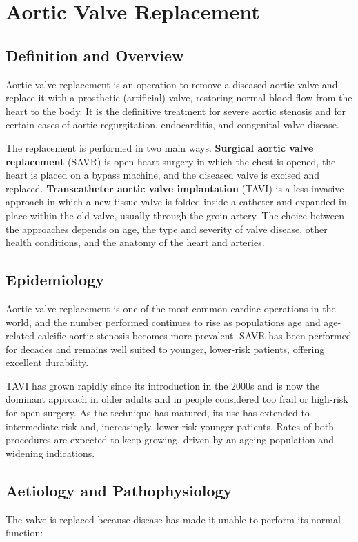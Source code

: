 \chapter{Aortic Valve Replacement}

\section*{Definition and Overview}
Aortic valve replacement is an operation to remove a diseased aortic valve and replace it with a prosthetic (artificial) valve, restoring normal blood flow from the heart to the body. It is the definitive treatment for severe aortic stenosis and for certain cases of aortic regurgitation, endocarditis, and congenital valve disease.

The replacement is performed in two main ways. \textbf{Surgical aortic valve replacement} (SAVR) is open-heart surgery in which the chest is opened, the heart is placed on a bypass machine, and the diseased valve is excised and replaced. \textbf{Transcatheter aortic valve implantation} (TAVI) is a less invasive approach in which a new tissue valve is folded inside a catheter and expanded in place within the old valve, usually through the groin artery. The choice between the approaches depends on age, the type and severity of valve disease, other health conditions, and the anatomy of the heart and arteries.

\section*{Epidemiology}
Aortic valve replacement is one of the most common cardiac operations in the world, and the number performed continues to rise as populations age and age-related calcific aortic stenosis becomes more prevalent. SAVR has been performed for decades and remains well suited to younger, lower-risk patients, offering excellent durability.

TAVI has grown rapidly since its introduction in the 2000s and is now the dominant approach in older adults and in people considered too frail or high-risk for open surgery. As the technique has matured, its use has extended to intermediate-risk and, increasingly, lower-risk younger patients. Rates of both procedures are expected to keep growing, driven by an ageing population and widening indications.

\section*{Aetiology and Pathophysiology}
The valve is replaced because disease has made it unable to perform its normal function:

